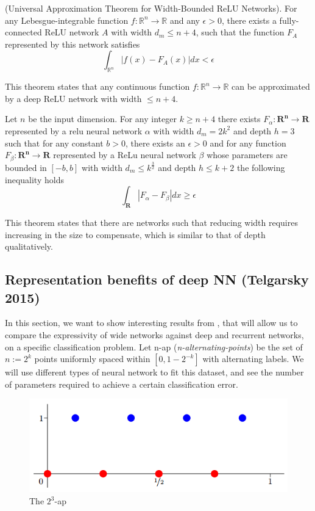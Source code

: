 \documentclass{article}
\begin{document}
\begin{thm}
(Universal Approximation Theorem for Width-Bounded ReLU Networks).
For any Lebesgue-integrable function $f:\mathbb{R}^n \to \mathbb{R}$ and any $\epsilon > 0$, there exists a fully-connected ReLU network $A$ with width $d_m \leq n + 4$, such that the function $F_A$ represented by this network satisfies
$$\int_{\mathbb{R}^n} |f(x)-F_A(x)|dx < \epsilon$$
\end{thm}
This theorem states that any continuous function $f: \mathbb{R}^n \to \mathbb{R}$ can be approximated by a deep ReLU network with width $\leq n+4$.

\begin{thm}
    Let $n$ be the input dimension. For any integer $k \geq n+4$ there exists $F_{\alpha}: \mathbf{R^n} \rightarrow \mathbf{R}$ represented by a relu neural network $\alpha$ with width $d_m= 2k^2$ and depth $h=3$ such that for any constant $b>0$, there exists an $\epsilon>0$ and for any function $F_{\beta}: \mathbf{R^n} \rightarrow \mathbf{R}$ represented by a ReLu neural network $\beta$ whose parameters are bounded in $[-b,b]$ with width $d_m \leq k^{\frac{3}{2}}$ and depth $h \leq k+2$ the following inequality holds
    $$\int_{\mathbf{R}} |F_{\alpha} - F_{\beta}| dx \geq \epsilon$$
\end{thm}

This theorem states that there are networks such that reducing width requires increasing in the size to compensate, which is similar to that of depth qualitatively.

\subsection{Representation benefits of deep NN (Telgarsky 2015)}
In this section, we want to show interesting results from \cite{telgarsky2015representation}, that will allow us to compare the expressivity of wide networks against deep and recurrent networks, on a specific classification problem. Let n-ap (\textit{n-alternating-points}) be the set of $n := 2^k$ points  uniformly spaced within $[0, 1-2^{-k}]$ with alternating labels. We will use different types of neural network to fit this dataset, and see the number of parameters required to achieve a certain classification error.
\begin{figure}[H]
    \centering
    \includegraphics[width=.6\textwidth]{figures/nap.png}
    \caption{The $2^3$-ap \cite{telgarsky2015representation}}
\end{figure}
\end{document}

